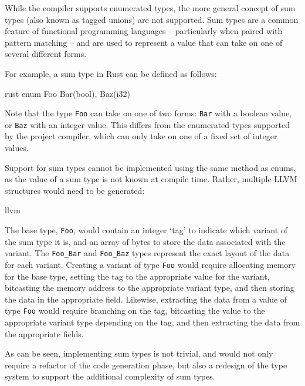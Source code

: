 While the compiler supports enumerated types, the more general concept of sum types (also known as
tagged unions) are not supported. Sum types are a common feature of functional programming languages
-- particularly when paired with pattern matching -- and are used to represent a value that can take
on one of several different forms.

For example, a sum type in Rust can be defined as follows:

\begin{code}{rust}
    enum Foo {
        Bar(bool),
        Baz(i32)
    }
\end{code}

Note that the type \texttt{Foo} can take on one of two forms: \texttt{Bar} with a boolean value, or
\texttt{Baz} with an integer value. This differs from the enumerated types supported by the project
compiler, which can only take on one of a fixed set of integer values.

Support for sum types cannot be implemented using the same method as enums, as the value of a sum
type is not known at compile time. Rather, multiple LLVM structures would need to be generated:

\begin{code}{llvm}
\end{code}

The base type, \texttt{Foo}, would contain an integer `tag' to indicate which variant of the sum
type it is, and an array of bytes to store the data associated with the variant. The
\texttt{Foo_Bar} and \texttt{Foo_Baz} types represent the exact layout of the data for each variant.
Creating a variant of type \texttt{Foo} would require allocating memory for the base type, setting
the tag to the appropriate value for the variant, bitcasting the memory address to the appropriate
variant type, and then storing the data in the appropriate field. Likewise, extracting the data from
a value of type \texttt{Foo} would require branching on the tag, bitcasting the value to the
appropriate variant type depending on the tag, and then extracting the data from the appropriate
fields.

As can be seen, implementing sum types is not trivial, and would not only require a refactor of the
code generation phase, but also a redesign of the type system to support the additional complexity
of sum types.

